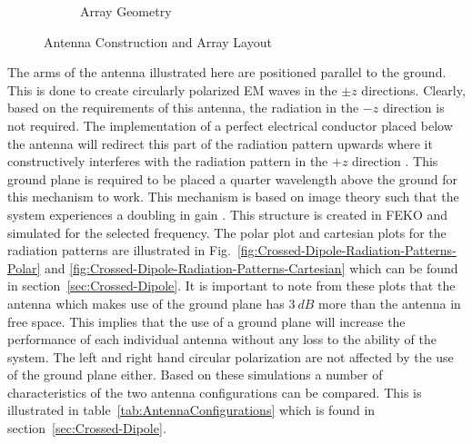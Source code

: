 \documentclass[11pt]{witseiepaper}
\begin{document}
\begin{bibunit}[witseie]
\begin{figure}[htb]
\begin{subfigure}{.3\textwidth}
            \caption{Array Geometry}
            \label{fig:ArrayGeometry}  
            \end{subfigure}
\caption{Antenna Construction and Array Layout}
\label{fig:AntennaConstructionArrayLayout}
\end{figure}
The arms of the antenna illustrated here are positioned parallel to the ground. This is done to create circularly polarized EM waves in the $\pm z$ directions.
Clearly, based on the requirements of this antenna, the radiation in the $-z$ direction is not required. The implementation of a perfect electrical conductor placed below the antenna will redirect this part of the radiation pattern upwards where it constructively interferes with the radiation pattern in the $+z$ direction \cite[p.~110-111]{IEEECrossedDipole}. This ground plane is required to be placed a quarter wavelength above the ground for this mechanism to work. This mechanism is based on image theory such that the system experiences a doubling in gain \cite[p.~111]{IEEECrossedDipole}. This structure is created in FEKO \cite{FEKO} and simulated for the selected frequency. The polar plot and cartesian plots for the radiation patterns are illustrated in Fig.~\ref{fig:Crossed-Dipole-Radiation-Patterns-Polar} and \ref{fig:Crossed-Dipole-Radiation-Patterns-Cartesian}  which can be found in section~\ref{sec:Crossed-Dipole}. It is important to note from these plots that the antenna which makes use of the ground plane has $3~dB$ more than the antenna in free space. This implies that the use of a ground plane will increase the performance of each individual antenna without any loss to the ability of the system. The left and right hand circular polarization are not affected by the use of the ground plane either. Based on these simulations a number of characteristics of the two antenna configurations can be compared. This is illustrated in table~\ref{tab:AntennaConfigurations} which is found in section~\ref{sec:Crossed-Dipole}.



\end{bibunit}
\end{document}
